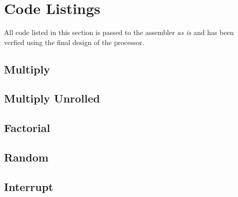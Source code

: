 

\section{Code Listings}
All code listed in this section is passed to the assembler \emph{as is} and has been verfied using the final design of the processor.
\subsection{Multiply}
\label{sec:multiply_appendix}

\subsection{Multiply Unrolled}
\label{sec:multiply_unrolled_appendix}

\subsection{Factorial}
\label{sec:factorial_appendix}

\subsection{Random}
\label{sec:random_appendix}

\subsection{Interrupt}
\label{sec:interrupt_appendix}


